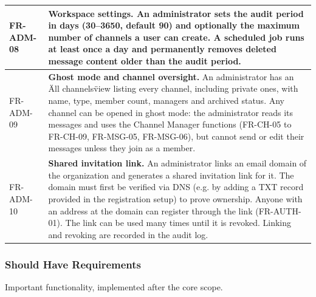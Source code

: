 \documentclass[
    english, %
]{VUMIFPSkursinis}
\begin{document}
\begin{longtable}{|p{}|p{}|}
FR-ADM-08 & \textbf{Workspace settings.} An administrator sets the audit period in days (30--3650, default 90) and optionally the maximum number of channels a user can create. A scheduled job runs at least once a day and permanently removes deleted message content older than the audit period. \\ \hline
FR-ADM-09 & \textbf{Ghost mode and channel oversight.} An administrator has an \"All channels\" view listing every channel, including private ones, with name, type, member count, managers and archived status. Any channel can be opened in ghost mode: the administrator reads its messages and uses the Channel Manager functions (FR-CH-05 to FR-CH-09, FR-MSG-05, FR-MSG-06), but cannot send or edit their messages unless they join as a member. \\ \hline
FR-ADM-10 & \textbf{Shared invitation link.} An administrator links an email domain of the organization and generates a shared invitation link for it. The domain must first be verified via DNS (e.g. by adding a TXT record provided in the registration setup) to prove ownership. Anyone with an address at the domain can register through the link (FR-AUTH-01). The link can be used many times until it is revoked. Linking and revoking are recorded in the audit log. \\ \hline
\end{longtable}

\subsubsection{Should Have Requirements}
Important functionality, implemented after the core scope.
\end{document}

